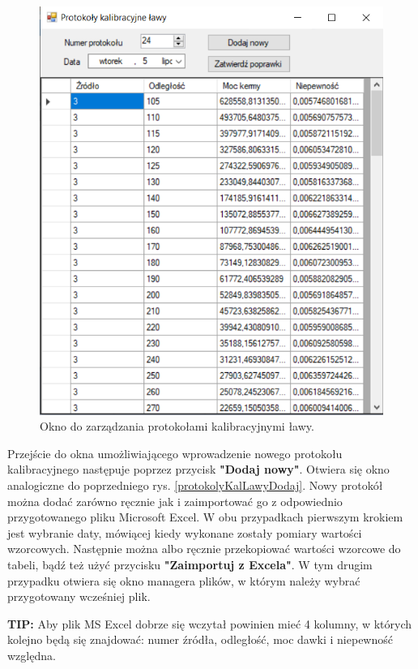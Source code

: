 \begin{figure}[htb]
	\centering
	\includegraphics{obrazki/Ustawienia/protokoly_kalibracyjne_lawy.png}
	\caption{Okno do zarządzania protokołami kalibracyjnymi ławy.}
	\label{protokolyKalLawy}
\end{figure}

Przejście do okna umożliwiającego wprowadzenie nowego protokołu kalibracyjnego następuje poprzez przycisk \textbf{"Dodaj nowy"}. Otwiera się okno analogiczne do poprzedniego rys. \ref{protokolyKalLawyDodaj}. Nowy protokół można dodać zarówno ręcznie jak i zaimportować go z odpowiednio przygotowanego pliku Microsoft Excel. W obu przypadkach pierwszym krokiem jest wybranie daty, mówiącej kiedy wykonane zostały pomiary wartości wzorcowych. Następnie można albo ręcznie przekopiować wartości wzorcowe do tabeli, bądź też użyć przycisku \textbf{"Zaimportuj z Excela"}. W tym drugim przypadku otwiera się okno managera plików, w którym należy wybrać przygotowany wcześniej plik. 

\textbf{TIP:} Aby plik MS Excel dobrze się wczytał powinien mieć 4 kolumny, w których kolejno będą się znajdować: numer źródła, odległość, moc dawki i niepewność względna.

